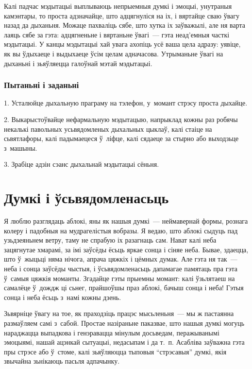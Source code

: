 Калі падчас мэдытацыі выплываюць непрыемныя думкі і эмоцыі, унутраныя камэнтары, то проста адзначайце, што адцягнуліся на іх, і вяртайце сваю ўвагу назад да дыханьня. Можаце пахваліць сябе, што хутка іх заўважылі, але ня варта лаяць сябе за гэта: адцягненьне і вяртаньне ўвагі~--- гэта неад'емныя часткі мэдытацыі. У канцы мэдытацыі хай увага ахопіць усё ваша цела адразу: уявіце, як вы ўдыхаеце і выдыхаеце ўсім целам адначасова. Утрыманьне ўвагі на дыханьні і зьяўляецца галоўнай мэтай мэдытацыі.

\subsubsection{Пытаньні і заданьні}

1. Усталюйце дыхальную праграму на тэлефон, у~момант стрэсу проста дыхайце.

2. Выкарыстоўвайце нефармальную мэдытацыю, напрыклад кожны раз робячы некалькі павольных усьвядомленых дыхальных цыклаў, калі стаіце на сьвятлафоры, калі падымаецеся ў~ліфце, калі сядаеце за стырно або выходзьце з~машыны.

3. Зрабіце адзін сэанс дыхальнай мэдытацыі сёньня.


\section{Думкі і ўсьвядомленасьць}

Я люблю разглядаць аблокі, яны як нашыя думкі~--- неймавернай формы, рознага колеру і падобныя на мудрагелістыя вобразы. Я ведаю, што аблокі сыдуць пад узьдзеяньнем ветру, таму не спрабую іх разагнаць сам. Нават калі неба зацягнутае хмарамі, за імі заўсёды ёсьць яркае сонца і сіняе неба. Бывае, здаецца, што ў~жыцьці няма нічога, апрача цяжкіх і цёмных думак. Але гэта ня так~--- неба і сонца заўсёды чыстыя, і ўсьвядомленасьць дапамагае памятаць пра гэта ў~самыя цяжкія моманты. Згадайце гэты прыемны момант: калі ўзьлятаеш на самалёце ў~дождж ці сьнег, прайшоўшы праз аблокі, бачыш сонца і неба! Гэтыя сонца і неба ёсьць з~намі кожны дзень.

Зьвярніце ўвагу на тое, як праходзіць працэс мысьленьня~--- мы ж пастаянна размаўляем самі з~сабой. Простае назіраньне паказвае, што нашыя думкі могуць нараджацца выпадкова і генэравацца мінулым досьведам, перажыванымі эмоцыямі, нашай ацэнкай сытуацыі, недасыпам і да т.~п. Асабліва заўважна гэта пры стрэсе або ў~стоме, калі зьяўляюцца тыповыя ``стрэсавыя'' думкі, якія звычайна зьнікаюць пасьля адпачынку.

